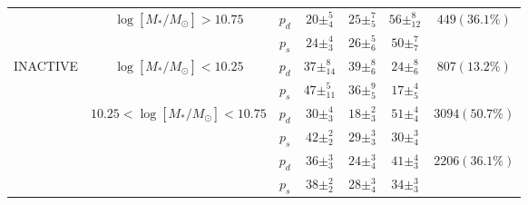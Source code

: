 \documentclass[useAMS,usenatbib]{mn2e}
\begin{document}
\begin{table*}
\begin{tabular}{c|c|c|c|c|c|c}
                           & \multirow{2}{*}{$\log [M_*/M_{\odot}] > 10.75$}                      & $p_d$     & $20\pm_{4}^{5}$ & $25\pm_{5}^{7}$                    & $56\pm_{12}^{8}$       & \multirow{2}{*}{$449 (36.1\%)$}                      \\
                           &                                                 & $p_s$     & $24\pm_{3}^{4}$                     & $26\pm_{6}^{5}$                    & $50\pm_{7}^{7}$        &                                                      \\ \hline \hline
\multirow{6}{*}{INACTIVE}  & \multirow{2}{*}{$\log [M_*/M_{\odot}] < 10.25 $}                       & $p_d$     & $37\pm_{14}^{8}$                    & $39\pm_{6}^{8}$                    & $24\pm_{6}^{8}$        & \multirow{2}{*}{$807 (13.2\%)$}                      \\
                           &                                                 & $p_s$     & $47\pm_{11}^{5}$                    & $36\pm_{5}^{9}$                    & $17\pm_{5}^{4}$        &                                                      \\ \cline{2-7} 
                           & \multirow{2}{*}{$10.25 < \log [M_*/M_{\odot}] < 10.75$}                    & $p_d$     &          $30\pm_{3}^{4}$                          &       $18\pm_{3}^{2}$                            &    $51\pm_{4}^{4}$                   & \multirow{2}{*}{$3094 (50.7\%)$}                     \\
                           &                                                 & $p_s$     & $42\pm_{2}^{2}$            & $29\pm_{3}^{3}$   & $30\pm_{4}^{3}$ &                                                      \\ \cline{2-7} 
                           & {\multirow{2}{*}{$\log [M_*/M_{\odot}] > 10.75$}} & $p_d$     & $36\pm_{3}^{3}$            & $24\pm_{4}^{3}$         & $41\pm_{3}^{4}$ & \multicolumn{1}{l}{\multirow{2}{*}{$2206 (36.1\%)$}} \\
                           & \multicolumn{1}{l|}{}                           & $p_s$      & $38\pm_{2}^{2}$              & $28\pm_{4}^{3}$            & $34\pm_{3}^{3}$ & \multicolumn{1}{l}{}                                 \\ \hline                       
\end{tabular}
\end{table*}
\end{document}
